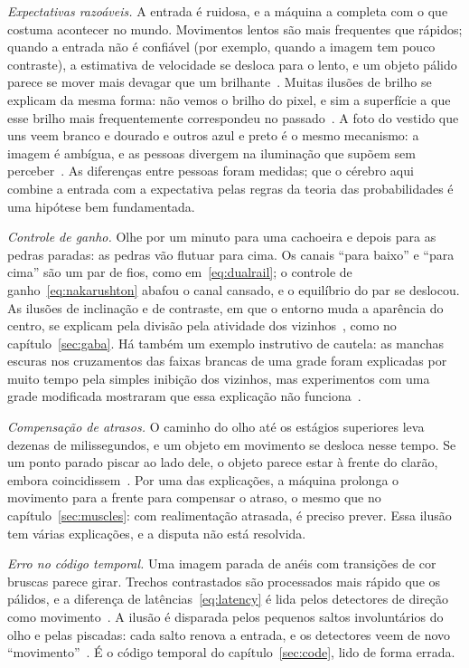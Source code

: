 \emph{Expectativas razoáveis.} A entrada é ruidosa, e a máquina a completa com o que costuma acontecer no mundo. Movimentos lentos são mais frequentes que rápidos; quando a entrada não é confiável (por exemplo, quando a imagem tem pouco contraste), a estimativa de velocidade se desloca para o lento, e um objeto pálido parece se mover mais devagar que um brilhante~\cite{Weiss2002}. Muitas ilusões de brilho se explicam da mesma forma: não vemos o brilho do pixel, e sim a superfície a que esse brilho mais frequentemente correspondeu no passado~\cite{Purves2011}. A foto do vestido que uns veem branco e dourado e outros azul e preto é o mesmo mecanismo: a imagem é ambígua, e as pessoas divergem na iluminação que supõem sem perceber~\cite{LaferSousa2015,Wallisch2017}. As diferenças entre pessoas foram medidas; que o cérebro aqui combine a entrada com a expectativa pelas regras da teoria das probabilidades é uma hipótese bem fundamentada.

\emph{Controle de ganho.} Olhe por um minuto para uma cachoeira e depois para as pedras paradas: as pedras vão flutuar para cima. Os canais ``para baixo'' e ``para cima'' são um par de fios, como em~\eqref{eq:dualrail}; o controle de ganho~\eqref{eq:nakarushton} abafou o canal cansado, e o equilíbrio do par se deslocou. As ilusões de inclinação e de contraste, em que o entorno muda a aparência do centro, se explicam pela divisão pela atividade dos vizinhos~\cite{Schwartz2009}, como no capítulo~\ref{sec:gaba}. Há também um exemplo instrutivo de cautela: as manchas escuras nos cruzamentos das faixas brancas de uma grade foram explicadas por muito tempo pela simples inibição dos vizinhos, mas experimentos com uma grade modificada mostraram que essa explicação não funciona~\cite{SchillerCarvey2005}.

\emph{Compensação de atrasos.} O caminho do olho até os estágios superiores leva dezenas de milissegundos, e um objeto em movimento se desloca nesse tempo. Se um ponto parado piscar ao lado dele, o objeto parece estar à frente do clarão, embora coincidissem~\cite{Nijhawan1994}. Por uma das explicações, a máquina prolonga o movimento para a frente para compensar o atraso, o mesmo que no capítulo~\ref{sec:muscles}: com realimentação atrasada, é preciso prever. Essa ilusão tem várias explicações, e a disputa não está resolvida.

\emph{Erro no código temporal.} Uma imagem parada de anéis com transições de cor bruscas parece girar. Trechos contrastados são processados mais rápido que os pálidos, e a diferença de latências~\eqref{eq:latency} é lida pelos detectores de direção como movimento~\cite{Conway2005}. A ilusão é disparada pelos pequenos saltos involuntários do olho e pelas piscadas: cada salto renova a entrada, e os detectores veem de novo ``movimento''~\cite{OteroMillan2012}. É o código temporal do capítulo~\ref{sec:code}, lido de forma errada.

